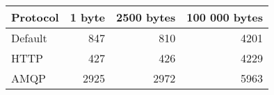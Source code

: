 \begin{tabular}{lrrr}
\hline
 Protocol   &   1 byte &   2500 bytes &   100 000 bytes \\
\hline
 Default    &      847 &          810 &            4201 \\
 HTTP       &      427 &          426 &            4229 \\
 AMQP       &     2925 &         2972 &            5963 \\
\hline
\end{tabular}